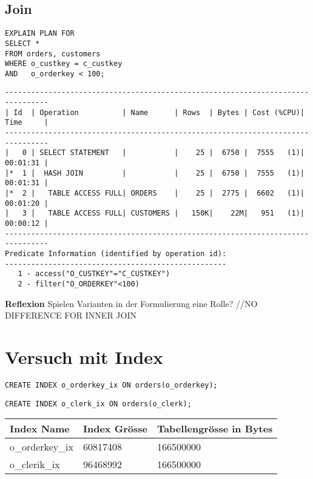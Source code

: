 \documentclass[10pt]{article}
\begin{document}
\subsection{Join}
\begin{lstlisting}[style=sqlNoTitle]
EXPLAIN PLAN FOR
SELECT *
FROM orders, customers
WHERE o_custkey = c_custkey
AND   o_orderkey < 100;
\end{lstlisting}
\begin{lstlisting}[style=queryexecutionplan]
--------------------------------------------------------------------------------
| Id  | Operation          | Name      | Rows  | Bytes | Cost (%CPU)| Time     |
--------------------------------------------------------------------------------
|   0 | SELECT STATEMENT   |           |    25 |  6750 |  7555   (1)| 00:01:31 |
|*  1 |  HASH JOIN         |           |    25 |  6750 |  7555   (1)| 00:01:31 |
|*  2 |   TABLE ACCESS FULL| ORDERS    |    25 |  2775 |  6602   (1)| 00:01:20 |
|   3 |   TABLE ACCESS FULL| CUSTOMERS |   150K|    22M|   951   (1)| 00:00:12 |
--------------------------------------------------------------------------------
Predicate Information (identified by operation id):
---------------------------------------------------
   1 - access("O_CUSTKEY"="C_CUSTKEY")
   2 - filter("O_ORDERKEY"<100)
\end{lstlisting}
\textbf{Reflexion} \newline
Spielen Varianten in der Formulierung eine Rolle?
//NO DIFFERENCE FOR INNER JOIN

\section{Versuch mit Index}
\begin{lstlisting}[style=sql]
CREATE INDEX o_orderkey_ix ON orders(o_orderkey);
\end{lstlisting}
\begin{lstlisting}[style=sql]
CREATE INDEX o_clerk_ix ON orders(o_clerk);
\end{lstlisting}
{\normalsize
\begin{tabular}{|l|l|l|}
\hline
 Index Name & Index Grösse & Tabellengrösse in Bytes \\
\hline
\hline
o\_orderkey\_ix & 60817408 & 166500000 \\
\hline
o\_clerik\_ix & 96468992	 & 166500000 \\
\hline
\end{tabular}
}
\end{document}
